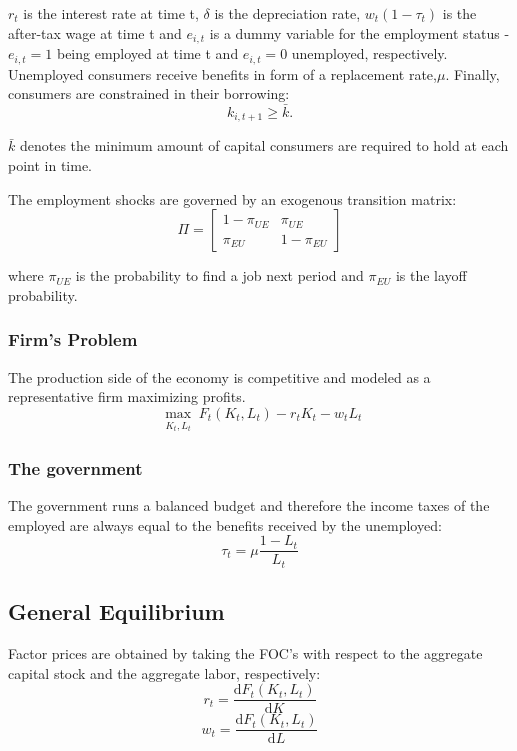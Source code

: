 \documentclass[a4paper,12pt]{article}
\begin{document}
$r_{t}$ is the interest rate at time t, $\delta$ is the depreciation rate, $w_{t}(1-\tau_{t})$ is the after-tax wage at time t and $e_{i,t}$ is a dummy variable for the employment status - $e_{i,t}=1$ being employed at time t and $ e_{i,t}=0$ unemployed, respectively. Unemployed consumers receive benefits in form of a replacement rate,$\mu$. Finally, consumers are constrained in their borrowing:
   \begin{equation}
  \label{eq:borconstraint}
   k_{i,t + 1} \geq \bar{k}.
 	 \end{equation}
 	 
$\bar{k}$ denotes the minimum amount of capital consumers are required to hold at each point in time.

The employment shocks are governed by an exogenous transition matrix: 
\[ \Pi = \begin{bmatrix}
1-\pi_{UE} & \pi_{UE} \\
 \pi_{EU} & 1-\pi_{EU}
\end{bmatrix}
\]

where $\pi_{UE}$ is the probability to find a job next period and $\pi_{EU}$ is the layoff probability. 

\subsubsection*{Firm's Problem}

The production side of the economy is competitive and modeled as a representative firm maximizing profits. 
\[ \max_{\substack{K_{t},L_{t}}}F_{t}(K_{t},L_{t})-r_{t}K_{t}-w_{t}L_{t}
\]

\subsubsection*{The government}

The government runs a balanced budget and therefore the income taxes of the employed are always equal to the benefits received by the unemployed: 
\begin{equation}
  \label{eq:balancedbudget}
\tau_{t}=\mu\frac{1-L_{t}}{L_{t}}
\end{equation}


\subsection{General Equilibrium}

Factor prices are obtained by taking the FOC's with respect to the aggregate capital stock and the aggregate labor, respectively: 
\[
r_{t} = \frac{\mathrm d F_{t}(K_{t},L_{t})}{\mathrm d K} 
\]
\[
w_{t} = \frac{\mathrm d F_{t}(K_{t},L_{t})}{\mathrm d L} 
\]
\end{document}

